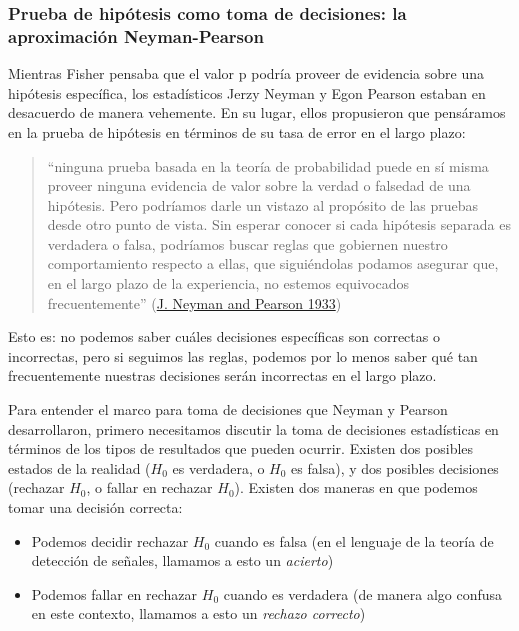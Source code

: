 \documentclass[
  12pt,
]{book}
\providecommand{\tightlist}{%
  \setlength{\itemsep}{0pt}\setlength{\parskip}{0pt}}
\theoremstyle{definition}
\theoremstyle{definition}
\theoremstyle{definition}
\theoremstyle{remark}
\begin{document}
\hypertarget{prueba-de-hipuxf3tesis-como-toma-de-decisiones-la-aproximaciuxf3n-neyman-pearson}{%
\subsubsection{Prueba de hipótesis como toma de decisiones: la aproximación Neyman-Pearson}\label{prueba-de-hipuxf3tesis-como-toma-de-decisiones-la-aproximaciuxf3n-neyman-pearson}}

Mientras Fisher pensaba que el valor p podría proveer de evidencia sobre una hipótesis específica, los estadísticos Jerzy Neyman y Egon Pearson estaban en desacuerdo de manera vehemente. En su lugar, ellos propusieron que pensáramos en la prueba de hipótesis en términos de su tasa de error en el largo plazo:

\begin{quote}
``ninguna prueba basada en la teoría de probabilidad puede en sí misma proveer ninguna evidencia de valor sobre la verdad o falsedad de una hipótesis. Pero podríamos darle un vistazo al propósito de las pruebas desde otro punto de vista. Sin esperar conocer si cada hipótesis separada es verdadera o falsa, podríamos buscar reglas que gobiernen nuestro comportamiento respecto a ellas, que siguiéndolas podamos asegurar que, en el largo plazo de la experiencia, no estemos equivocados frecuentemente'' (\protect\hyperlink{ref-Neyman289}{J. Neyman and Pearson 1933})
\end{quote}

Esto es: no podemos saber cuáles decisiones específicas son correctas o incorrectas, pero si seguimos las reglas, podemos por lo menos saber qué tan frecuentemente nuestras decisiones serán incorrectas en el largo plazo.

Para entender el marco para toma de decisiones que Neyman y Pearson desarrollaron, primero necesitamos discutir la toma de decisiones estadísticas en términos de los tipos de resultados que pueden ocurrir. Existen dos posibles estados de la realidad (\(H_0\) es verdadera, o \(H_0\) es falsa), y dos posibles decisiones (rechazar \(H_0\), o fallar en rechazar \(H_0\)). Existen dos maneras en que podemos tomar una decisión correcta:

\begin{itemize}
\tightlist
\item
  Podemos decidir rechazar \(H_0\) cuando es falsa (en el lenguaje de la teoría de detección de señales, llamamos a esto un \emph{acierto})
\item
  Podemos fallar en rechazar \(H_0\) cuando es verdadera (de manera algo confusa en este contexto, llamamos a esto un \emph{rechazo correcto})
\end{itemize}
\end{document}
